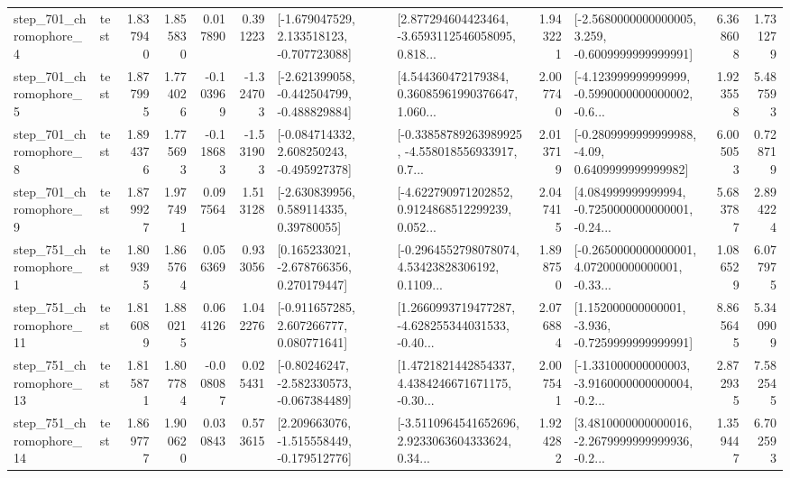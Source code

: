 \begin{tabular}{llrrrrllrlrr}
   step\_701\_chromophore\_4 &      test &      1.837940 &    1.855830 &      0.017890 &  0.391223 &   [-1.679047529, 2.133518123, -0.707723088] &  [2.877294604423464, -3.6593112546058095, 0.818... &       1.943221 &  [-2.5680000000000005, 3.259, -0.6009999999999991] &            6.368608 &          1.731279 \\
   step\_701\_chromophore\_5 &      test &      1.877995 &    1.774026 &     -0.103969 & -1.324703 &  [-2.621399058, -0.442504799, -0.488829884] &  [4.544360472179384, 0.36085961990376647, 1.060... &       2.007740 &  [-4.123999999999999, -0.5990000000000002, -0.6... &            1.923558 &          5.487593 \\
   step\_701\_chromophore\_8 &      test &      1.894376 &    1.775693 &     -0.118683 & -1.531903 &   [-0.084714332, 2.608250243, -0.495927378] &  [-0.33858789263989925, -4.558018556933917, 0.7... &       2.013719 &   [-0.2809999999999988, -4.09, 0.6409999999999982] &            6.005053 &          0.728719 \\
   step\_701\_chromophore\_9 &      test &      1.879927 &    1.977491 &      0.097564 &  1.513128 &     [-2.630839956, 0.589114335, 0.39780055] &  [-4.622790971202852, 0.9124868512299239, 0.052... &       2.047415 &  [4.084999999999994, -0.7250000000000001, -0.24... &            5.683787 &          2.894224 \\
   step\_751\_chromophore\_1 &      test &      1.809395 &    1.865764 &      0.056369 &  0.933056 &    [0.165233021, -2.678766356, 0.270179447] &  [-0.2964552798078074, 4.53423828306192, 0.1109... &       1.898750 &  [-0.2650000000000001, 4.072000000000001, -0.33... &            1.086529 &          6.077975 \\
  step\_751\_chromophore\_11 &      test &      1.816089 &    1.880215 &      0.064126 &  1.042276 &    [-0.911657285, 2.607266777, 0.080771641] &  [1.2660993719477287, -4.628255344031533, -0.40... &       2.076884 &   [1.152000000000001, -3.936, -0.7259999999999991] &            8.865645 &          5.340909 \\
  step\_751\_chromophore\_13 &      test &      1.815871 &    1.807784 &     -0.008087 &  0.025431 &   [-0.80246247, -2.582330573, -0.067384489] &  [1.4721821442854337, 4.4384246671671175, -0.30... &       2.007541 &  [-1.331000000000003, -3.9160000000000004, -0.2... &            2.872935 &          7.582545 \\
  step\_751\_chromophore\_14 &      test &      1.869777 &    1.900620 &      0.030843 &  0.573615 &   [2.209663076, -1.515558449, -0.179512776] &  [-3.5110964541652696, 2.9233063604333624, 0.34... &       1.924282 &  [3.4810000000000016, -2.2679999999999936, -0.2... &            1.359447 &          6.702593 \\

\end{tabular}
